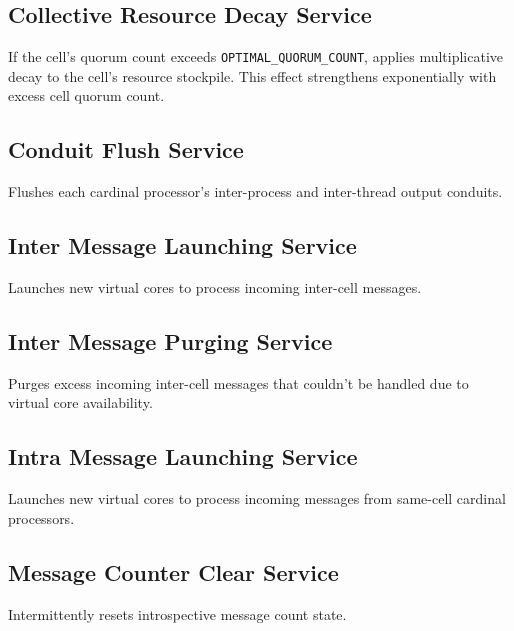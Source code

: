\subsection{Collective Resource Decay Service}


If the cell's quorum count exceeds \texttt{OPTIMAL\_QUORUM\_COUNT}, applies multiplicative decay to the cell's resource stockpile.
This effect strengthens exponentially with excess cell quorum count.

\subsection{Conduit Flush Service}


Flushes each cardinal processor's inter-process and inter-thread output conduits.

\subsection{Inter Message Launching Service}


Launches new virtual cores to process incoming inter-cell messages.

\subsection{Inter Message Purging Service}


Purges excess incoming inter-cell messages that couldn't be handled due to virtual core availability.

\subsection{Intra Message Launching Service}


Launches new virtual cores to process incoming messages from same-cell cardinal processors.

\subsection{Message Counter Clear Service}


Intermittently resets introspective message count state.

